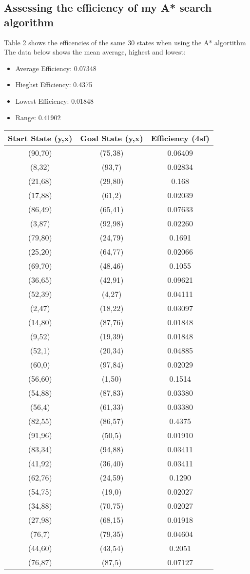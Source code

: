 \documentclass[11pt,oneside]{article}
\begin{document}
\subsection{Assessing the efficiency of my A* search algorithm}
Table 2 shows the efficencies of the same 30 states when using the A* algortithm The data below shows the mean average, highest and lowest:
\begin{itemize}
	\item Average Efficiency: 0.07348
	\item Hieghst Efficiency: 0.4375
	\item Lowest Efficiency: 0.01848
	\item Range: 0.41902
\end{itemize}

\begin{table}[ht]
    \centering
    \begin{tabular}{|c|c|c|}
	Start State (y,x)&Goal State (y,x)&Efficiency (4sf) \\ \hline
	(90,70)&(75,38)&0.06409 \\
	(8,32)&(93,7)&0.02834 \\
	(21,68)&(29,80)&0.168 \\
	(17,88)&(61,2)&0.02039 \\
	(86,49)&(65,41)&0.07633 \\
	(3,87)&(92,98)&0.02260 \\
	(79,80)&(24,79)&0.1691 \\
	(25,20)&(64,77)&0.02066 \\
	(69,70)&(48,46)&0.1055 \\
	(36,65)&(42,91)&0.09621 \\
	(52,39)&(4,27)&0.04111 \\
	(2,47)&(18,22)&0.03097 \\
	(14,80)&(87,76)&0.01848 \\
	(9,52)&(19,39)&0.01848 \\
	(52,1)&(20,34)&0.04885 \\
	(60,0)&(97,84)&0.02029 \\
	(56,60)&(1,50)&0.1514 \\
	(54,88)&(87,83)&0.03380 \\
	(56,4)	&(61,33)&0.03380 \\
	(82,55)&(86,57)&0.4375 \\
	(91,96)&(50,5)&0.01910 \\
	(83,34)&(94,88)&0.03411 \\
	(41,92)&(36,40)&0.03411 \\
	(62,76)&(24,59)&0.1290 \\
	(54,75)&(19,0)&0.02027 \\
	(34,88)&(70,75)&0.02027\\
	(27,98)&(68,15)&0.01918 \\
	(76,7)	&(79,35)&0.04604 \\
	(44,60)&(43,54)&0.2051 \\
	(76,87)&(87,5)&0.07127 \\


\end{tabular}
\end{table}
\end{document}
